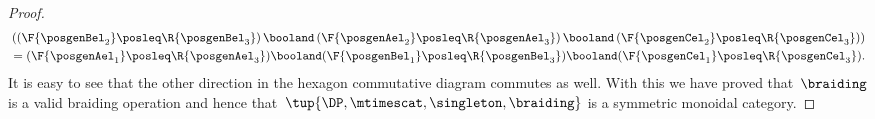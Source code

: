 \begin{proof}
\begin{equation}
\begin{aligned}
             & \left(\left(\F{\posgenBel_2}\posleq \R{\posgenBel_3}\right)\booland \left(\F{\posgenAel_2}\posleq \R{\posgenAel_3}\right) \booland \left(\F{\posgenCel_2}\posleq \R{\posgenCel_3}\right)\right)                                                                                                                        \\
             & =(\F{\posgenAel_1}\posleq \R{\posgenAel_3}) \booland (\F{\posgenBel_1}\posleq \R{\posgenBel_3}) \booland (\F{\posgenCel_1}\posleq \R{\posgenCel_3}).
        \end{aligned}
    \end{equation}
    It is easy to see that the other direction in the hexagon commutative diagram commutes as well.
    With this we have proved that~$\braiding$ is a valid braiding operation and hence that~$\tup{\DP, \mtimescat, \singleton, \braiding}$ is a symmetric monoidal category.
\end{proof}
